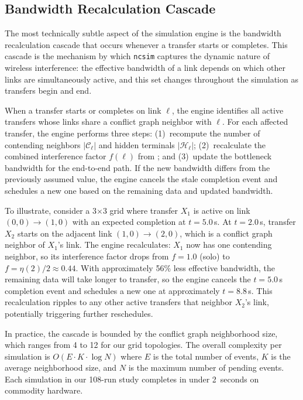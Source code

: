\documentclass[conference]{IEEEtran}
\newcommand{\ncsim}{\texttt{ncsim}}
\begin{document}
\subsection{Bandwidth Recalculation Cascade}

The most technically subtle aspect of the simulation engine is the bandwidth
recalculation cascade that occurs whenever a transfer starts or completes.
This cascade is the mechanism by which \ncsim{} captures the dynamic nature
of wireless interference: the effective bandwidth of a link depends on which
other links are simultaneously active, and this set changes throughout the
simulation as transfers begin and end.

When a transfer starts or completes on link $\ell$, the engine identifies
all active transfers whose links share a conflict graph neighbor with
$\ell$.  For each affected transfer, the engine performs three steps:
(1)~recompute the number of contending neighbors $|\mathcal{C}_\ell|$ and
hidden terminals $|\mathcal{H}_\ell|$; (2)~recalculate the combined
interference factor $f(\ell)$ from ; and (3)~update the
bottleneck bandwidth for the end-to-end path.  If the new bandwidth differs
from the previously assumed value, the engine cancels the stale completion
event and schedules a new one based on the remaining data and updated
bandwidth.

To illustrate, consider a 3$\times$3 grid where transfer $X_1$ is active
on link $(0,0) \to (1,0)$ with an expected completion at $t = 5.0$\,s.
At $t = 2.0$\,s, transfer $X_2$ starts on the adjacent link
$(1,0) \to (2,0)$, which is a conflict graph neighbor of $X_1$'s link.
The engine recalculates: $X_1$ now has one contending neighbor, so its
interference factor drops from $f = 1.0$ (solo) to $f = \eta(2)/2 \approx 0.44$.
With approximately 56\% less effective bandwidth, the remaining data
will take longer to transfer, so the engine cancels the $t = 5.0$\,s
completion event and schedules a new one at approximately $t = 8.8$\,s.
This recalculation ripples to any other active transfers that neighbor
$X_2$'s link, potentially triggering further reschedules.

In practice, the cascade is bounded by the conflict graph neighborhood
size, which ranges from 4 to 12 for our grid topologies.  The overall
complexity per simulation is $O(E \cdot K \cdot \log N)$ where $E$ is
the total number of events, $K$ is the average neighborhood size, and $N$
is the maximum number of pending events.  Each simulation in our 108-run
study completes in under 2~seconds on commodity hardware.
\end{document}
